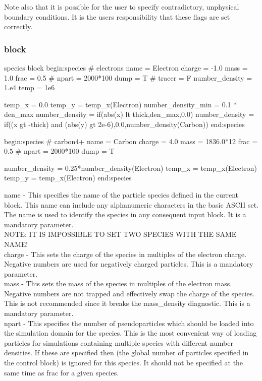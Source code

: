Note also that it is possible for the user to specify contradictory,
unphysical boundary conditions. It is the users responsibility that these
flags are set correctly.

\subsubsection{ block}

\begin{lboxverbatim}{species block}
begin:species
   # electrons
   name = Electron
   charge = -1.0
   mass = 1.0
   frac = 0.5
   # npart = 2000*100
   dump = T
   # tracer = F
   number_density = 1.e4
   temp = 1e6

   temp_x = 0.0
   temp_y = temp_x(Electron)
   number_density_min = 0.1 * den_max
   number_density = if(abs(x) lt thick,den_max,0.0)
   number_density = if((x gt -thick) and (abs(y) gt 2e-6),0.0,number_density(Carbon))
end:species

begin:species
   # carbon4+
   name = Carbon
   charge = 4.0
   mass = 1836.0*12
   frac = 0.5
   # npart = 2000*100
   dump = T

   number_density = 0.25*number_density(Electron)
   temp_x = temp_x(Electron)
   temp_y = temp_x(Electron)
end:species
\end{lboxverbatim}

{\emphtext name} - This specifies the name of the particle species defined
in the current block. This name can include any alphanumeric characters in
the basic ASCII set. The name is used to identify the species in any
consequent input block. It is a mandatory parameter.\\

{\emphtext NOTE: IT IS IMPOSSIBLE TO SET TWO SPECIES WITH THE SAME NAME!} \\

{\emphtext charge} - This sets the charge of the species in
multiples of the electron charge. Negative numbers are used for negatively
charged particles. This is a mandatory parameter.\\

{\emphtext mass} - This sets the mass of the species in multiples
of the electron mass. Negative numbers are not trapped and effectively swap the
charge of the species. This is not recommended since it breaks the
mass\_density diagnostic. This is a mandatory parameter.\\

{\emphtext npart} - This specifies the number of pseudoparticles
which should be loaded into the simulation domain for the species. This is the
most convenient way of loading particles for simulations containing multiple
species with different number densities. If these are specified then
 (the global number of particles specified in the control
block) is ignored for this species. It should not be specified at the same time
as frac for a given species.\\


